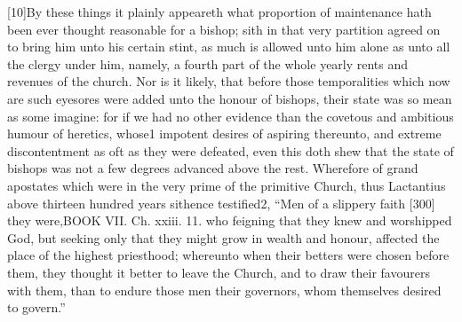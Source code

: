 [10]By these things it plainly appeareth what proportion of maintenance hath been ever thought reasonable for a bishop; sith in that very partition agreed on to bring him unto his certain stint, as much is allowed unto him alone as unto all the clergy under him, namely, a fourth part of the whole yearly rents and revenues of the church. Nor is it likely, that before those temporalities which now are such eyesores were added unto the honour of bishops, their state was so mean as some imagine: for if we had no other evidence than the covetous and ambitious humour of heretics, whose1 impotent desires of aspiring thereunto, and extreme discontentment as oft as they were defeated, even this doth shew that the state of bishops was not a few degrees advanced above the rest. Wherefore of grand apostates which were in the very prime of the primitive Church, thus Lactantius above thirteen hundred years sithence testified2, “Men of a slippery faith [300] they were,BOOK VII. Ch. xxiii. 11. who feigning that they knew and worshipped God, but seeking only that they might grow in wealth and honour, affected the place of the highest priesthood; whereunto when their betters were chosen before them, they thought it better to leave the Church, and to draw their favourers with them, than to endure those men their governors, whom themselves desired to govern.”

